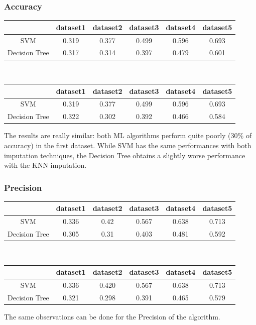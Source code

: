 \documentclass{article}
\begin{document}
\subsubsection*{Accuracy}
\begin{table}[H]
\begin{tabular}{|c|c|c|c|c|c|}
\hline
 & dataset1 & dataset2 & dataset3 & dataset4 & dataset5 \\ \hline
SVM & 0.319 & 0.377 & 0.499 & 0.596 & 0.693 \\
\hline
Decision Tree & 0.317 & 0.314 & 0.397 & 0.479 & 0.601 \\ \hline
\end{tabular}\\
\begin{tabular}{|c|c|c|c|c|c|}
\hline
 & dataset1 & dataset2 & dataset3 & dataset4 & dataset5 \\ \hline
SVM & 0.319 & 0.377 & 0.499 & 0.596 & 0.693 \\ \hline
Decision Tree & 0.322 & 0.302 & 0.392 & 0.466 & 0.584 \\ \hline
\end{tabular}
\end{table}The results are really similar: both ML algorithms perform quite poorly (30\% of accuracy) in the first dataset. While SVM has the same performances with both imputation techniques, the Decision Tree obtains a slightly worse performance with the KNN imputation.
\subsubsection*{Precision}
\begin{table}[H]
\begin{tabular}{|c|c|c|c|c|c|}
\hline
 & dataset1 & dataset2 & dataset3 & dataset4 & dataset5 \\ \hline
SVM & 0.336 & 0.42 & 0.567 & 0.638 & 0.713 \\ \hline
Decision Tree & 0.305 & 0.31 & 0.403 & 0.481 & 0.592 \\ \hline
\end{tabular}\\
\begin{tabular}{|c|c|c|c|c|c|}
\hline
 & dataset1 & dataset2 & dataset3 & dataset4 & dataset5 \\ \hline
SVM & 0.336 & 0.420 & 0.567 & 0.638 & 0.713 \\ \hline
Decision Tree & 0.321 & 0.298 & 0.391 & 0.465 & 0.579 \\ \hline
\end{tabular}
\end{table}
The same observations can be done for the Precision of the algorithm.
\end{document}
